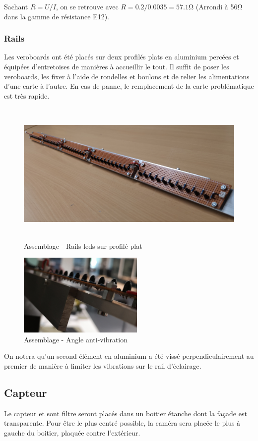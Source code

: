Sachant \(R = U / I\), on se retrouve avec \(R = 0.2 / 0.0035 = 57.1 \si{\ohm} \) (Arrondi à 56\si{\ohm} dans la gamme de résistance E12).
\newpage
\subsubsection{Rails}
Les veroboards ont été placés sur deux profilés plats en aluminium percées et équipées d'entretoises de manières à accueillir le tout. Il suffit de poser les veroboards,
les fixer à l'aide de rondelles et boulons et de relier les alimentations d'une carte à l'autre. En cas de panne, le remplacement de la carte problématique est très rapide.

\begin{figure}[H]
    \centering
    \includegraphics[height=7cm]{assets/figures/rail_alu_led.jpg}
    \caption{Assemblage - Rails leds sur profilé plat}
\end{figure}

\begin{figure}[H]
    \centering
    \includegraphics[height=4cm]{assets/figures/eclairage_cote.jpg}
    \caption{Assemblage - Angle anti-vibration}
\end{figure}

On notera qu'un second élément en aluminium a été vissé perpendiculairement au premier de manière à limiter les vibrations sur le rail d'éclairage.

\subsection{Capteur}
Le capteur et sont filtre seront placés dans un boitier étanche dont la façade est transparente. Pour être le plus centré possible, la caméra sera placée
le plus à gauche du boitier, plaquée contre l'extérieur.
\newpage

